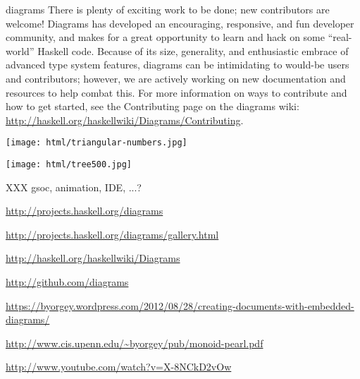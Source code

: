 \begin{hcarentry}[updated]{diagrams}
There is plenty of exciting work to be done; new contributors are
welcome!  Diagrams has developed an encouraging, responsive, and fun
developer community, and makes for a great opportunity to learn and
hack on some ``real-world'' Haskell code.  Because of its size,
generality, and enthusiastic embrace of advanced type system features,
diagrams can be intimidating to would-be users and contributors;
however, we are actively working on new documentation and resources to
help combat this.  For more information on ways to contribute and how
to get started, see the Contributing page on the diagrams wiki:
\url{http://haskell.org/haskellwiki/Diagrams/Contributing}.

\begin{center}
\texttt{[image: html/triangular-numbers.jpg]}
\end{center}

\begin{center}
\texttt{[image: html/tree500.jpg]}
\end{center}

\FuturePlans

XXX gsoc, animation, IDE, ...?

\FurtherReading
\begin{compactitem}
\item \url{http://projects.haskell.org/diagrams}
\item \url{http://projects.haskell.org/diagrams/gallery.html}
\item \url{http://haskell.org/haskellwiki/Diagrams}
\item \url{http://github.com/diagrams}
\item
  \url{https://byorgey.wordpress.com/2012/08/28/creating-documents-with-embedded-diagrams/}
\item \url{http://www.cis.upenn.edu/~byorgey/pub/monoid-pearl.pdf}
\item \url{http://www.youtube.com/watch?v=X-8NCkD2vOw}
\end{compactitem}
\end{hcarentry}
